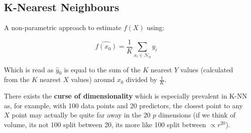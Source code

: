 \subsection{K-Nearest Neighbours}

A non-parametric approach to estimate $f(X)$ using:

$$ \hat{f(x_{0})} = \frac{1}{K} \sum_{x_{i}\in \mathcal{N}_{0}} y_{i} $$

Which is read as $\hat{y}_{0}$ is equal to the sum of the $K$ nearest $Y$ values (calculated from the $K$ nearest $X$ values) around $x_{0}$ divided by $\frac{1}{K}$.

There exists the \textbf{curse of dimensionality} which is especially prevalent in K-NN as, for example, with 100 data points and 20 predictors, the closest point to any $X$ point may actually be quite far away in the 20 $p$ dimensions (if we think of volume, its not 100 split between 20, its more like 100 split between $\propto r^{20}$).
